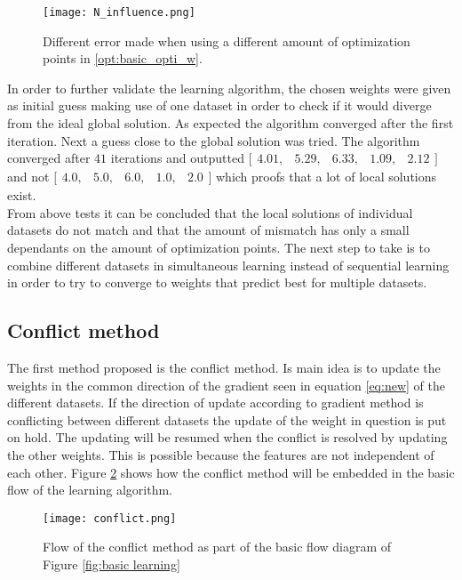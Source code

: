  \begin{figure}[h!]
 	\centering
 	\texttt{[image: N\_influence.png]}
 	\caption{Different error made when using a different amount of optimization points in \ref{opt:basic_opti_w}.}
 	\label{fig:N_influence}
 \end{figure}
 
 In order to further validate the learning algorithm, the chosen weights were given as initial guess making use of one dataset in order to check if it would diverge from the ideal global solution. As expected the algorithm converged after the first iteration. Next a guess close to the global solution was tried. The algorithm converged after $41$ iterations and outputted $\bigl[ \begin{smallmatrix} 4.01,&5.29,&6.33,&1.09,&2.12\end{smallmatrix}\bigr]$ and not $\bigl[ \begin{smallmatrix} 4.0,&5.0,&6.0,&1.0,&2.0\end{smallmatrix}\bigr]$ which proofs that a lot of local solutions exist.\\  
 
 From above tests it can be concluded that the local solutions of individual datasets do not match and that the amount of mismatch has only a small dependants on the amount of optimization points. The next step to take is to combine different datasets in simultaneous learning instead of sequential learning in order to try to converge to weights that predict best for multiple datasets. 
 
 \subsection{Conflict method}
 The first method proposed is the conflict method. Is main idea is to update the weights in the common direction of the gradient seen in equation \ref{eq:new} of the different datasets. If the direction of update according to gradient method is conflicting between different datasets the update of the weight in question is put on hold. The updating will be resumed when the conflict is resolved by updating the other weights. This is possible because the features are not independent of each other. Figure \ref{fig:conflict} shows how the conflict method will be embedded in the basic flow of the learning algorithm.\\
 
  \begin{figure}[h!]
 	\centering
 	\texttt{[image: conflict.png]}
 	\caption{Flow of the conflict method as part of the basic flow diagram of Figure \ref{fig:basic learning}}
 	\label{fig:conflict}
 \end{figure}

